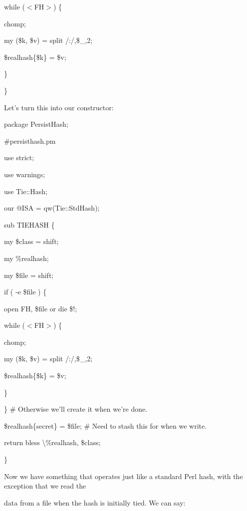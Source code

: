 \documentclass[a4paper,11pt]{book}
\begin{document}
\noindent while ($<$FH$>$) \{

\noindent chomp;

\noindent my (\$k, \$v) = split /:/,\$\_,2;

\noindent \$realhash\{\$k\} = \$v;

\noindent \}

\noindent \}

\noindent 

\noindent Let's turn this into our constructor:

\noindent 

\noindent 

\noindent package PersistHash;

\noindent \#persisthash.pm

\noindent use strict;

\noindent use warnings;

\noindent use Tie::Hash;

\noindent our @ISA = qw(Tie::StdHash);

\noindent sub TIEHASH \{

\noindent my \$class = shift;

\noindent my \%realhash;

\noindent my \$file = shift;

\noindent if ( -e \$file ) \{

\noindent open FH, \$file or die \$!;

\noindent while ($<$FH$>$) \{

\noindent chomp;

\noindent my (\$k, \$v) = split /:/,\$\_,2;

\noindent \$realhash\{\$k\} = \$v;

\noindent \}

\noindent \} \# Otherwise we'll create it when we're done.

\noindent \$realhash\{\underbar{  }secret\underbar{  }\} = \$file; \# Need to stash this for when we write.

\noindent return bless \textbackslash \%realhash, \$class;

\noindent \}

\noindent 

\noindent Now we have something that operates just like a standard Perl hash, with the exception that we read the

\noindent data from a file when the hash is initially tied. We can say:

\noindent 

\noindent 
\end{document}
